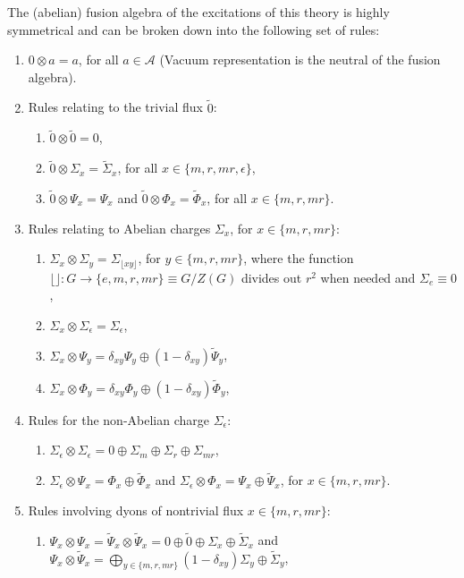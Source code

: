 \documentclass[two column]{article}
\begin{document}
The (abelian) fusion algebra of the excitations of this theory is highly symmetrical and can be broken down into the following set of rules:\begin{enumerate}
	\item $0 \otimes a = a$, for all $a \in \mathcal{A}$ (Vacuum representation is the neutral of the fusion algebra).
	\item Rules relating to the trivial flux $\tilde{0}$:\begin{enumerate}
		\item $\tilde{0} \otimes \tilde{0} = 0$,
		\item $\tilde{0} \otimes \Sigma_x = \tilde\Sigma_x$, for all $x \in \{m, r, mr, \epsilon\}$, 
		\item $\tilde{0} \otimes \Psi_x = \Psi_x$ and $\tilde{0} \otimes \Phi_x = \tilde\Phi_x$, for all $x \in \{m, r, mr\}$.
	\end{enumerate}
	\item Rules relating to Abelian charges $\Sigma_x$, for $x \in\{m, r, mr\}$:\begin{enumerate}
		\item $\Sigma_x \otimes \Sigma_y = \Sigma_{\lfloor xy \rfloor}$, for $ y \in \{m, r, mr\}$, where the function $\lfloor \rfloor: G \rightarrow \{e, m , r, mr\} \equiv G/Z(G)$ divides out $r^2$ when needed and $\Sigma_e \equiv 0$,
		\item $\Sigma_x \otimes \Sigma_\epsilon = \Sigma_\epsilon$,
		\item $\Sigma_x \otimes \Psi_y = \delta_{xy}\Psi_y \oplus(1-\delta_{xy})\tilde\Psi_y$,
		\item $\Sigma_x \otimes \Phi_y = \delta_{xy}\Phi_y \oplus(1-\delta_{xy})\tilde\Phi_y$,	
		\end{enumerate}
	\item Rules for the non-Abelian charge $\Sigma_\epsilon$:\begin{enumerate}
		\item $\Sigma_\epsilon \otimes \Sigma_\epsilon = 0 \oplus \Sigma_m \oplus \Sigma_r \oplus \Sigma_{mr}$,
		\item $\Sigma_\epsilon \otimes \Psi_x = \Phi_x \oplus \tilde\Phi_x$ and $\Sigma_\epsilon \otimes \Phi_x = \Psi_x \oplus \tilde\Psi_x$, for $x \in \{m , r, mr\}$. 
	\end{enumerate}
	\item Rules involving dyons of nontrivial flux $x \in \{m, r, mr\}$:\begin{enumerate}
		\item $\Psi_x \otimes \Psi_x = \tilde\Psi_x \otimes \tilde\Psi_x = 0 \oplus \tilde 0 \oplus \Sigma_x \oplus \tilde\Sigma_x$ and $\Psi_x \otimes \tilde\Psi_x = \bigoplus_{y\in \{m, r, mr\}}(1-\delta_{xy})\Sigma_y \oplus \tilde \Sigma_y$,

\end{enumerate}
\end{enumerate}
\end{document}
